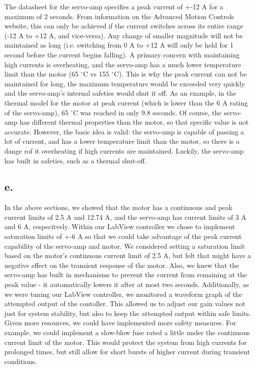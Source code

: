 \documentclass{article}
\theoremstyle{plain}
\theoremstyle{definition}
\theoremstyle{remark}
\begin{document}
The datasheet for the servo-amp specifies a peak current of +-12 A for a maximum of 2 seconds. From information on the Advanced Motion Controls website, this can only be achieved if the current switches across its entire range (-12 A to +12 A, and vice-versa). Any change of smaller magnitude will not be maintained as long (i.e. switching from 0 A to +12 A will only be held for 1 second before the current begins falling). A primary concern with maintaining high currents is overheating, and the servo-amp has a much lower temperature limit than the motor (65 $^\circ$C vs 155 $^\circ$C). This is why the peak current can not be maintained for long, the maximum temperature would be exceeded very quickly and the servo-amp's internal safeties would shut it off. As an example, in the thermal model for the motor at peak current (which is lower than the 6 A rating of the servo-amp), 65 $^\circ$C was reached in only 9.8 seconds. Of course, the servo-amp has different thermal properties than the motor, so that specific value is not accurate. However, the basic idea is valid: the servo-amp is capable of passing a lot of current, and has a lower temperature limit than the motor, so there is a dange rof it overheating if high currents are maintained. Luckily, the servo-amp has built in safeties, such as a thermal shut-off.   

\subsection*{e.}
In the above sections, we showed that the motor has a continuous and peak current limits of 2.5 A and 12.74 A, and the servo-amp  has current limits of 3 A and 6 A, respecitvely. Within our LabView controller we chose to implement saturation limits of +-6 A so that we could take advantage of the peak current capability of the servo-amp and motor. We considered setting a saturation limit based on the motor's continuous current limit of 2.5 A, but felt that might have a negative effect on the transient response of the motor. Also, we knew that the servo-amp has built in mechanisms to prevent the current from remaining at the peak value - it automatically lowers it after at most two seconds. Additionally, as we were tuning our LabView controller, we monitored a waveform graph of the attempted output of the contoller. This allowed us to adjust our gain values not just for system stability, but also to keep the attempted output within safe limits. Given more resources, we could have implemented more safety measures. For example, we could implement a slow-blow fuse rated a little under the continuous current limit of the motor. This would protect the system from high currents for prolonged times, but still allow for short bursts of higher current during transient conditions.
\end{document}

